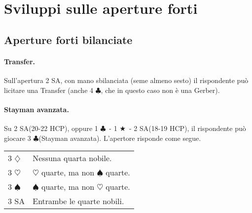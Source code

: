 \documentclass[a4paper,10pt]{article}
\renewcommand{\c}{$\clubsuit$\xspace}
\renewcommand{\d}{$\diamondsuit$\xspace}
\newcommand{\h}{$\heartsuit$\xspace}
\newcommand{\s}{$\spadesuit$\xspace}
\renewcommand{\j}{$\bigstar$\xspace}
\newcommand{\sa}{SA\xspace}
\newcommand{\smallspace}{\vskip0.3cm}
\newenvironment{twocol}
  {\smallspace\noindent\begin{tabular}{l p{0.78\textwidth}}}
  {\end{tabular}\smallspace}
\begin{document}
\pagebreak

\section{Sviluppi sulle aperture forti}


\subsection{Aperture forti bilanciate}

\paragraph{Transfer.} Sull'apertura 2 \sa, con mano sbilanciata (seme almeno sesto) il rispondente può licitare una Transfer (anche 4 \c, che in questo caso non è una Gerber).

\paragraph{Stayman avanzata.} Su 2 \sa (20-22 HCP), oppure 1 \c\ - 1 \j\ - 2 \sa (18-19 HCP), il rispondente può giocare 3 \c (Stayman avanzata). L'apertore risponde come segue.
\begin{twocol}
 3 \d & Nessuna quarta nobile.\\
 3 \h & \h quarte, ma non \s quarte.\\
 3 \s & \s quarte, ma non \h quarte.\\
 3 \sa & Entrambe le quarte nobili.\\
\end{twocol}
\end{document}
